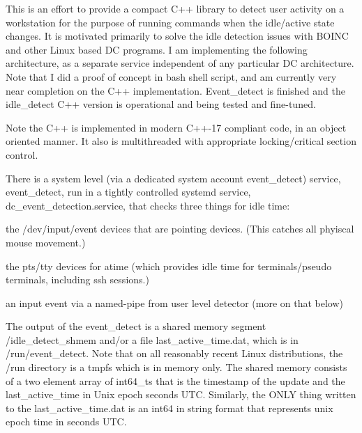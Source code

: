 This is an effort to provide a compact C++ library to detect user activity on a workstation for the purpose of running commands when the idle/active state changes. It is motivated primarily to solve the idle detection issues with B\+O\+I\+NC and other Linux based DC programs. I am implementing the following architecture, as a separate service independent of any particular DC architecture. Note that I did a proof of concept in bash shell script, and am currently very near completion on the C++ implementation. Event\+\_\+detect is finished and the idle\+\_\+detect C++ version is operational and being tested and fine-\/tuned.

Note the C++ is implemented in modern C++-\/17 compliant code, in an object oriented manner. It also is multithreaded with appropriate locking/critical section control.


\begin{DoxyEnumerate}
\item There is a system level (via a dedicated system account event\+\_\+detect) service, event\+\_\+detect, run in a tightly controlled systemd service, dc\+\_\+event\+\_\+detection.\+service, that checks three things for idle time\+:
\begin{DoxyItemize}
\item the /dev/input/event devices that are pointing devices. (This catches all phyiscal mouse movement.)
\item the pts/tty devices for atime (which provides idle time for terminals/pseudo terminals, including ssh sessions.)
\item an input event via a named-\/pipe from user level detector (more on that below)
\end{DoxyItemize}
\end{DoxyEnumerate}

The output of the event\+\_\+detect is a shared memory segment /idle\+\_\+detect\+\_\+shmem and/or a file last\+\_\+active\+\_\+time.\+dat, which is in /run/event\+\_\+detect. Note that on all reasonably recent Linux distributions, the /run directory is a tmpfs which is in memory only. The shared memory consists of a two element array of int64\+\_\+t\textquotesingle{}s that is the timestamp of the update and the last\+\_\+active\+\_\+time in Unix epoch seconds U\+TC. Similarly, the O\+N\+LY thing written to the last\+\_\+active\+\_\+time.\+dat is an int64 in string format that represents unix epoch time in seconds U\+TC.


